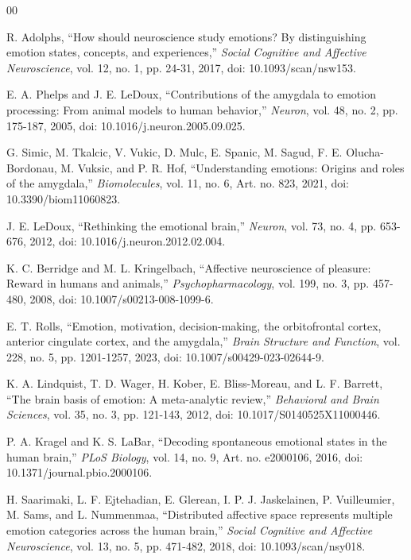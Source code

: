 \documentclass[conference]{IEEEtran}
\begin{document}
\begin{thebibliography}{00}

R. Adolphs, ``How should neuroscience study emotions? By distinguishing emotion states, concepts, and experiences,'' \emph{Social Cognitive and Affective Neuroscience}, vol. 12, no. 1, pp. 24-31, 2017, doi: 10.1093/scan/nsw153.

E. A. Phelps and J. E. LeDoux, ``Contributions of the amygdala to emotion processing: From animal models to human behavior,'' \emph{Neuron}, vol. 48, no. 2, pp. 175-187, 2005, doi: 10.1016/j.neuron.2005.09.025.

G. Simic, M. Tkalcic, V. Vukic, D. Mulc, E. Spanic, M. Sagud, F. E. Olucha-Bordonau, M. Vuksic, and P. R. Hof, ``Understanding emotions: Origins and roles of the amygdala,'' \emph{Biomolecules}, vol. 11, no. 6, Art. no. 823, 2021, doi: 10.3390/biom11060823.

J. E. LeDoux, ``Rethinking the emotional brain,'' \emph{Neuron}, vol. 73, no. 4, pp. 653-676, 2012, doi: 10.1016/j.neuron.2012.02.004.

K. C. Berridge and M. L. Kringelbach, ``Affective neuroscience of pleasure: Reward in humans and animals,'' \emph{Psychopharmacology}, vol. 199, no. 3, pp. 457-480, 2008, doi: 10.1007/s00213-008-1099-6.

E. T. Rolls, ``Emotion, motivation, decision-making, the orbitofrontal cortex, anterior cingulate cortex, and the amygdala,'' \emph{Brain Structure and Function}, vol. 228, no. 5, pp. 1201-1257, 2023, doi: 10.1007/s00429-023-02644-9.

K. A. Lindquist, T. D. Wager, H. Kober, E. Bliss-Moreau, and L. F. Barrett, ``The brain basis of emotion: A meta-analytic review,'' \emph{Behavioral and Brain Sciences}, vol. 35, no. 3, pp. 121-143, 2012, doi: 10.1017/S0140525X11000446.

P. A. Kragel and K. S. LaBar, ``Decoding spontaneous emotional states in the human brain,'' \emph{PLoS Biology}, vol. 14, no. 9, Art. no. e2000106, 2016, doi: 10.1371/journal.pbio.2000106.

H. Saarimaki, L. F. Ejtehadian, E. Glerean, I. P. J. Jaskelainen, P. Vuilleumier, M. Sams, and L. Nummenmaa, ``Distributed affective space represents multiple emotion categories across the human brain,'' \emph{Social Cognitive and Affective Neuroscience}, vol. 13, no. 5, pp. 471-482, 2018, doi: 10.1093/scan/nsy018.


\end{thebibliography}
\end{document}
